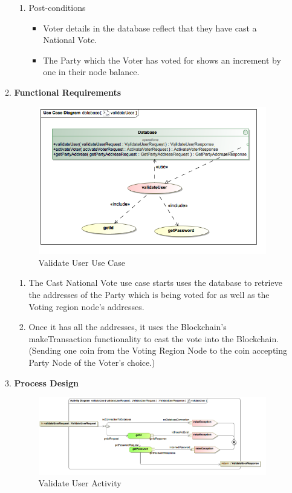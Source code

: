 \begin{enumerate}
\begin{enumerate}
\begin{enumerate}
			\item Post-conditions
			\begin{itemize}
				\item Voter details in the database reflect that they have cast a National Vote. 
				\item The Party which the Voter has voted for shows an increment by one in their node balance. 
			\end{itemize}
		\end{enumerate}
		
		\item \textbf{Functional Requirements}
		\begin{figure}[H]
			\centering
			\includegraphics[width=0.75\linewidth]{../Images/Database/UseCases/ValidateUser_UseCase.png}
			\caption{Validate User Use Case}
		\end{figure}
		
		\begin{enumerate}
			\item The Cast National Vote use case starts uses the database to retrieve the addresses of the Party which is being voted for as well as the Voting region node's addresses.   
			\item Once it has all the addresses, it uses the Blockchain's makeTransaction functionality to cast the vote into the Blockchain. (Sending one coin from the Voting Region Node to the coin accepting Party Node of the Voter's choice.) 
		\end{enumerate}
		
		
		
		
		\item \textbf{Process Design}
		\begin{figure}[H]
			\centering
			\includegraphics[width=0.75\linewidth]{../Images/Database/Activity/ValidateUser_Activity.png}
			\caption{Validate User Activity}
		\end{figure}
		

\end{enumerate}
\end{enumerate}

